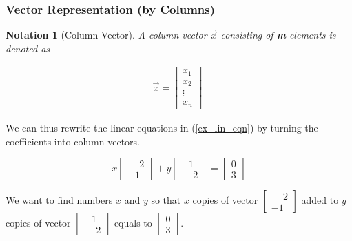 \documentclass{article}
\newtheorem{notation}{Notation}[section] %
\begin{document}
\subsubsection{Vector Representation (by Columns)}
\begin{notation}[Column Vector] A column vector $\vec{x}$ consisting of \textbf{m} elements is denoted as
\begin{center}
    \begin{equation}\label{col_vec}
    \begin{split}
    \vec{x}=\begin{bmatrix} x_1 \\ x_2 \\ \vdots \\ x_n \end{bmatrix} \;
    \end{split}
    \end{equation}
\end{center}
\end{notation}

We can thus rewrite the linear equations in (\ref{ex_lin_eqn}) by turning the coefficients into column vectors.
\begin{center}
\begin{equation}
    x \begin{bmatrix} \phantom{-} 2 \\ -1 \end{bmatrix} + y \begin{bmatrix} -1 \\ \phantom{-} 2 \end{bmatrix} = \begin{bmatrix} 0 \\ 3 \end{bmatrix}
\end{equation}
\end{center}

We want to find numbers $x$ and $y$ so that $x$ copies of vector $\begin{bmatrix} \phantom{-} 2 \\ -1 \end{bmatrix}$ added to $y$ copies of vector $\begin{bmatrix} -1 \\ \phantom{-} 2 \end{bmatrix}$ equals to $\begin{bmatrix} 0 \\ 3 \end{bmatrix}$.
\end{document}
